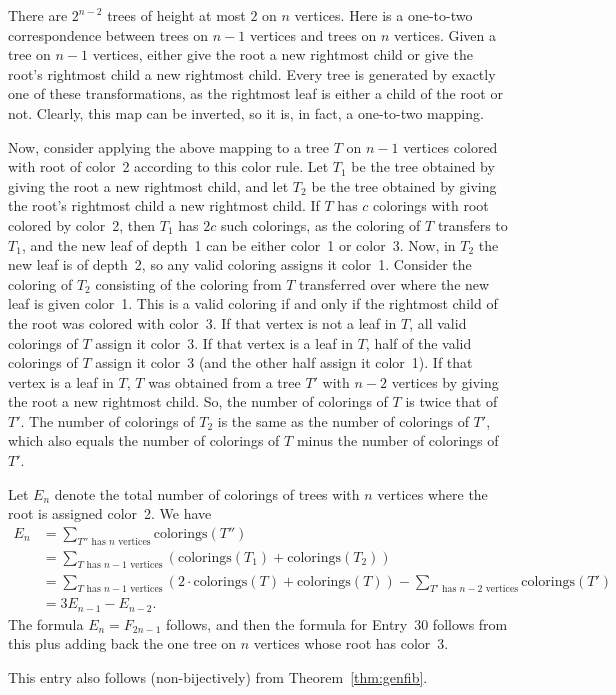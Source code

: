\documentclass[12pt]{amsart}
\begin{document}
\begin{description}
There are $2^{n-2}$ trees of height at most $2$ on $n$ vertices. Here is a one-to-two correspondence between trees on $n-1$ vertices and trees on $n$ vertices. Given a tree on $n-1$ vertices, either give the root a new rightmost child or give the root's rightmost child a new rightmost child. Every tree is generated by exactly one of these transformations, as the rightmost leaf is either a child of the root or not. Clearly, this map can be inverted, so it is, in fact, a one-to-two mapping.

Now, consider applying the above mapping to a tree $T$ on $n-1$ vertices colored with root of color~2 according to this color rule. Let $T_1$ be the tree obtained by giving the root a new rightmost child, and let $T_2$ be the tree obtained by giving the root's rightmost child a new rightmost child. If $T$ has $c$ colorings with root colored by color~2, then $T_1$ has $2c$ such colorings, as the coloring of $T$ transfers to $T_1$, and the new leaf of depth~1 can be either color~1 or color~3. Now, in $T_2$ the new leaf is of depth~2, so any valid coloring assigns it color~1. Consider the coloring of $T_2$ consisting of the coloring from $T$ transferred over where the new leaf is given color~1. This is a valid coloring if and only if the rightmost child of the root was colored with color~3. If that vertex is not a leaf in $T$, all valid colorings of $T$ assign it color~3. If that vertex is a leaf in $T$, half of the valid colorings of $T$ assign it color~3 (and the other half assign it color~1). If that vertex is a leaf in $T$, $T$ was obtained from a tree $T'$ with $n-2$ vertices by giving the root a new rightmost child. So, the number of colorings of $T$ is twice that of $T'$. The number of colorings of $T_2$ is the same as the number of colorings of $T'$, which also equals the number of colorings of $T$ minus the number of colorings of $T'$.

Let $E_n$ denote the total number of colorings of trees with $n$ vertices where the root is assigned color~2. We have
\begin{align*}
E_n&=\sum_{T''\text{ has $n$ vertices}}\text{colorings}(T'')\\
&=\sum_{T\text{ has $n-1$ vertices}}(\text{colorings}(T_1)+\text{colorings}(T_2))\\
&=\sum_{T\text{ has $n-1$ vertices}}(2\cdot\text{colorings}(T)+\text{colorings}(T))-\sum_{T'\text{ has $n-2$ vertices}}\text{colorings}(T')\\
&=3E_{n-1}-E_{n-2}.
\end{align*}
The formula $E_n=F_{2n-1}$ follows, and then the formula for Entry~30 follows from this plus adding back the one tree on $n$ vertices whose root has color~3.

This entry also follows (non-bijectively) from Theorem~\ref{thm:genfib}.
\end{description}
\end{document}
